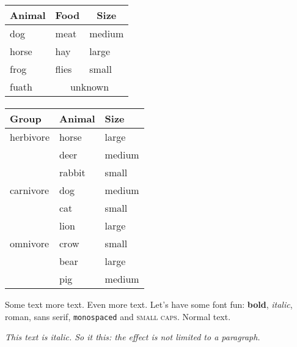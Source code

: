 \documentclass{article}
\begin{document}
\paragraph{}
\begin{tabular}{lll}
  \toprule
  \multicolumn{1}{c}{Animal} & \multicolumn{1}{c}{Food} & \multicolumn{1}{c}{Size} \\
  \midrule
  dog    & meat  & medium \\
  horse  & hay   & large  \\
  frog   & flies & small  \\
  fuath  & \multicolumn{2}{c}{unknown} \\
  \bottomrule
\end{tabular}
\paragraph{}
\begin{tabular}{lll}
  \toprule
  Group     & Animal & Size   \\
  \midrule
  herbivore & horse  & large  \\
            & deer   & medium \\
            & rabbit & small  \\
  \addlinespace
  carnivore & dog    & medium \\
            & cat    & small  \\
            & lion   & large  \\
  \addlinespace
  omnivore  & crow   & small  \\
            & bear   & large  \\
            & pig    & medium \\
  \bottomrule
\end{tabular}
Some text \hspace{1cm} more text.
\vspace{5cm}
Even more text.
Let's have some font fun: \textbf{bold}, \textit{italic}, \textrm{roman},
\textsf{sans serif}, \texttt{monospaced} and \textsc{small caps}.
Normal text.

{\itshape
This text is italic.
So it this: the effect is not limited to a paragraph.
}
\end{document}
